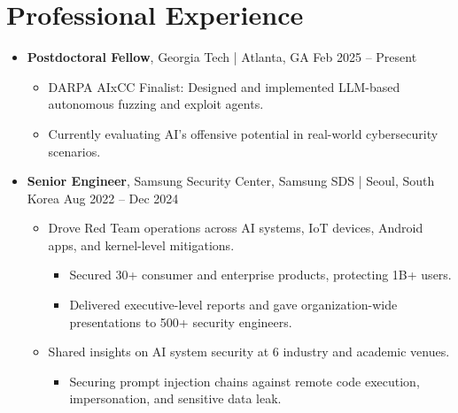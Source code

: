 \documentclass[11pt,letterpaper]{article}
\newcommand{\jobtitle}[1]{\textbf{#1}}
\newcommand{\location}[1]{\textcolor{secondary}{\small #1}}
\newcommand{\daterange}[1]{\textcolor{secondary}{\small #1}}
\begin{document}
\section{Professional Experience}
\begin{itemize}
\item \jobtitle{Postdoctoral Fellow}, \location{Georgia Tech | Atlanta, GA} \hfill \daterange{Feb 2025 -- Present}
    \begin{itemize}[] %
    \item DARPA AIxCC Finalist: Designed and implemented LLM-based autonomous fuzzing and exploit agents.
    \item Currently evaluating AI's offensive potential in real-world cybersecurity scenarios.
    \end{itemize}

\item \jobtitle{Senior Engineer}, \location{Samsung Security Center, Samsung SDS | Seoul, South Korea} \hfill \daterange{Aug 2022 -- Dec 2024}
    \begin{itemize}[] %
    \item Drove Red Team operations across AI systems, IoT devices, Android apps, and kernel-level mitigations.
        \begin{itemize}[] %
        \item Secured 30+ consumer and enterprise products, protecting 1B+ users.
        \item Delivered executive-level reports and gave organization-wide presentations to 500+ security engineers.
        \end{itemize}
    \item Shared insights on AI system security at 6 industry and academic venues.
        \begin{itemize}[]
        \item Securing prompt injection chains against remote code execution, impersonation, and sensitive data leak.
        \end{itemize}
    \end{itemize}


\end{itemize}
\end{document}
